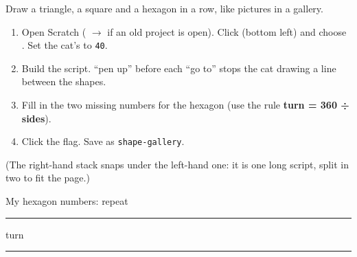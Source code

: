 \namedateline

\begin{core}
Draw a triangle, a square and a hexagon in a row, like pictures in a gallery.
\begin{enumerate}[leftmargin=1.4em,itemsep=1pt]
  \item Open Scratch ( $\rightarrow$  if an old project is open). Click  (bottom left) and choose . Set the cat's  to \texttt{40}.
  \item Build the script. \enquote{pen up} before each \enquote{go to} stops the cat drawing a line between the shapes.
  \item Fill in the two missing numbers for the hexagon (use the rule \textbf{turn = 360 ÷ sides}).
  \item Click the flag. Save as \texttt{shape-gallery}.
\end{enumerate}
\begin{center}
\begin{scratch}[scale=0.72]
\end{scratch}
\hspace{0.6cm}
\begin{scratch}[scale=0.72]
\end{scratch}
\end{center}
{\small (The right-hand stack snaps under the left-hand one: it is one long script, split in two to fit the page.)}

My hexagon numbers: repeat \rule{1.5cm}{0.4pt} \quad turn \rule{1.5cm}{0.4pt}
\end{core}

